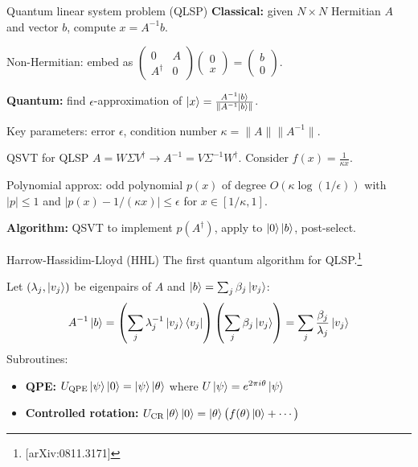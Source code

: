 \documentclass[aspectratio=169]{beamer}
\begin{document}
\begin{frame}{Quantum linear system problem (QLSP)}
\textbf{Classical:} given $N\times N$ Hermitian $A$ and vector $b$, compute $x=A^{-1}b$.

Non-Hermitian: embed as $\begin{pmatrix}0&A\\A^\dagger&0\end{pmatrix}\begin{pmatrix}0\\x\end{pmatrix}=\begin{pmatrix}b\\0\end{pmatrix}$.

\textbf{Quantum:} find $\epsilon$-approximation of $\ket{x}=\frac{A^{-1}\ket{b}}{\|A^{-1}\ket{b}\|}$.

Key parameters: error $\epsilon$, condition number $\kappa=\|A\|\|A^{-1}\|$.
\end{frame}

\begin{frame}{QSVT for QLSP}
$A=W\Sigma V^\dagger\to A^{-1}=V\Sigma^{-1}W^\dagger$. Consider $f(x)=\frac{1}{\kappa x}$.

Polynomial approx: odd polynomial $p(x)$ of degree $O(\kappa\log(1/\epsilon))$ with $|p|\le1$ and $|p(x)-1/(\kappa x)|\le\epsilon$ for $x\in[1/\kappa,1]$.

\textbf{Algorithm:} QSVT to implement $p(A^\dagger)$, apply to $\ket{0}\ket{b}$, post-select.
\end{frame}

\begin{frame}{Harrow-Hassidim-Lloyd (HHL)}
The first quantum algorithm for QLSP.\footnote{[arXiv:0811.3171]}

Let $(\lambda_j,\ket{v_j})$ be eigenpairs of $A$ and $\ket{b}=\sum_j\beta_j\ket{v_j}$:
$$A^{-1}\ket{b}=\left(\sum_j\lambda_j^{-1}\ket{v_j}\bra{v_j}\right)\left(\sum_j\beta_j\ket{v_j}\right)=\sum_j\frac{\beta_j}{\lambda_j}\ket{v_j}$$
Subroutines:
\begin{itemize}
\item \textbf{QPE:} $U_{\mathrm{QPE}}\ket{\psi}\ket{0}=\ket{\psi}\ket{\theta}$ where $U\ket{\psi}=e^{2\pi i\theta}\ket{\psi}$
\item \textbf{Controlled rotation:} $U_{\mathrm{CR}}\ket{\theta}\ket{0}=\ket{\theta}\bigl(f(\theta)\ket{0}+\cdots\bigr)$
\end{itemize}
\end{frame}
\end{document}
